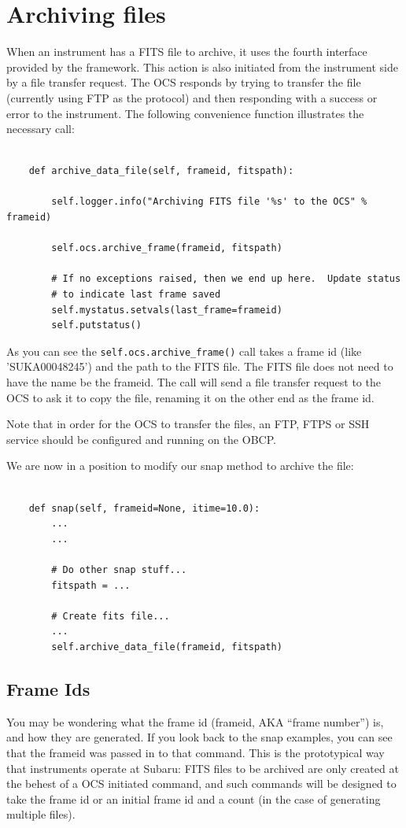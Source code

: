 \documentclass[11pt]{report}
\begin{document}
\section{Archiving files}
When an instrument has a FITS file to archive, it uses the fourth
interface provided by the framework. This action is also initiated from
the instrument side by a file transfer request. The OCS responds by
trying to transfer the file (currently using FTP as the protocol) and
then responding with a success or error to the instrument. The following
convenience function illustrates the necessary call: 
\begin{verbatim}

    def archive_data_file(self, frameid, fitspath):

        self.logger.info("Archiving FITS file '%s' to the OCS" % frameid)

        self.ocs.archive_frame(frameid, fitspath)

        # If no exceptions raised, then we end up here.  Update status
        # to indicate last frame saved
        self.mystatus.setvals(last_frame=frameid)
        self.putstatus()

\end{verbatim}
As you can see the {\tt self.ocs.archive\_frame()} call takes a frame id (like
'SUKA00048245') and the path to the FITS file. The FITS file does not
need to have the name be the frameid. The call will send a file transfer
request to the OCS to ask it to copy the file, renaming it on the other
end as the frame id. 

Note that in order for the OCS to transfer the files, an FTP, FTPS or
SSH service should be configured and running on the OBCP.   

We are now in a position to modify our snap method to archive the file:
\begin{verbatim}

    def snap(self, frameid=None, itime=10.0):
        ...
        ...

        # Do other snap stuff...
        fitspath = ...

        # Create fits file...
        ...
        self.archive_data_file(frameid, fitspath)

\end{verbatim}

\subsection{Frame Ids}
You may be wondering what the frame id (frameid, AKA ``frame number'') is,
and how they are generated. If you look back to the snap examples, you
can see that the frameid was passed in to that command. This is the
prototypical way that instruments operate at Subaru: FITS files to be
archived are only created at the behest of a OCS initiated command, and
such commands will be designed to take the frame id or an initial frame
id and a count (in the case of generating multiple files). 
\end{document}
